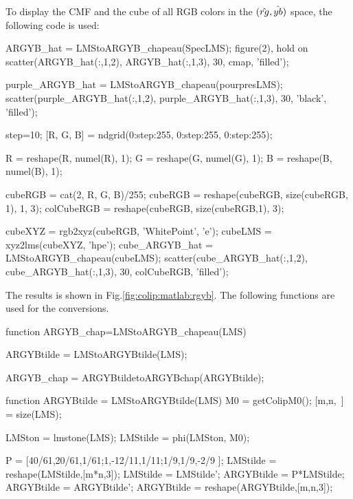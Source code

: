 To display the CMF and the cube of all RGB colors in the  $(\mathop{\hat{rg}}\nolimits,\mathop{\hat{yb}}\nolimits)$ space, the following code is used:
\begin{matlab}
ARGYB_hat = LMStoARGYB_chapeau(SpecLMS);
figure(2),
hold on
scatter(ARGYB_hat(:,1,2), ARGYB_hat(:,1,3), 30, cmap, 'filled');

purple_ARGYB_hat = LMStoARGYB_chapeau(pourpresLMS);
scatter(purple_ARGYB_hat(:,1,2), purple_ARGYB_hat(:,1,3), 30, 'black', 'filled');

step=10;
[R, G, B] = ndgrid(0:step:255, 0:step:255, 0:step:255);

R = reshape(R, numel(R), 1);
G = reshape(G, numel(G), 1);
B = reshape(B, numel(B), 1);

cubeRGB = cat(2, R, G, B)/255;
cubeRGB = reshape(cubeRGB, size(cubeRGB, 1), 1, 3);
colCubeRGB = reshape(cubeRGB, size(cubeRGB,1), 3);

cubeXYZ = rgb2xyz(cubeRGB, 'WhitePoint', 'e');
cubeLMS = xyz2lms(cubeXYZ, 'hpe');
cube_ARGYB_hat = LMStoARGYB_chapeau(cubeLMS);
scatter(cube_ARGYB_hat(:,1,2), cube_ARGYB_hat(:,1,3), 30, colCubeRGB, 'filled');
\end{matlab}

The results is shown in Fig.\ref{fig:colip:matlab:rgyb}. The following functions are used for the conversions.
\begin{matlab}
function ARGYB_chap=LMStoARGYB_chapeau(LMS)

ARGYBtilde = LMStoARGYBtilde(LMS);

ARGYB_chap = ARGYBtildetoARGYBchap(ARGYBtilde);
\end{matlab}


\begin{matlab}
function ARGYBtilde = LMStoARGYBtilde(LMS)
M0 = getColipM0();
[m,n,~] = size(LMS); %

LMSton = lmstone(LMS);
LMStilde = phi(LMSton, M0);

P = [40/61,20/61,1/61;1,-12/11,1/11;1/9,1/9,-2/9 ]; %
LMStilde = reshape(LMStilde,[m*n,3]);
LMStilde = LMStilde';
ARGYBtilde = P*LMStilde;
ARGYBtilde = ARGYBtilde';
ARGYBtilde = reshape(ARGYBtilde,[m,n,3]); 
\end{matlab}

